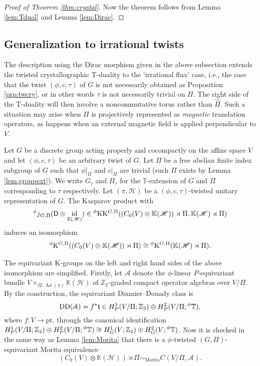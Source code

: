 \documentclass[11pt]{amsart}
\theoremstyle{definition}
\theoremstyle{plain}
\theoremstyle{remark}
\DeclareMathOperator{\id}{id}
\newcommand{\bK}{\mathbb{K}}
\newcommand{\bT}{\mathbb{T}}
\newcommand{\bZ}{\mathbb{Z}}
\newcommand{\cA}{\mathcal{A}}
\newcommand{\ft}{\mathfrak{t}}
\newcommand{\sfD}{\mathsf{D}}
\newcommand{\sH}{\mathscr{H}}
\newcommand{\K}{\mathrm{K}}%
\newcommand{\KK}{\mathrm{KK}}%
\DeclareMathOperator{\Ad}{Ad}
\newcommand{\pt}{\mathrm{pt}}
\begin{document}
\begin{proof}[Proof of Theorem \ref{thm:crystal}]
Now the theorem follows from Lemma \ref{lem:Tdual} and Lemma \ref{lem:Dirac}.
\end{proof}

\subsection{Generalization to irrational twists}\label{section:5.4}
The description using the Dirac morphism given in the above subsection extends the twisted crystallographic T-duality to the `irrational flux' case, i.e., the case that the twist $(\phi,c,\tau)$ of $G$ is not necessarily obtained as Proposition \ref{prp:twcry}, or in other words $\tau$ is not necessarily trivial on $\Pi$. The right side of the T-duality will then involve a noncommutative torus rather than $\hat{\Pi}$.
Such a situation may arise when $\Pi$ is projectively represented as \emph{magnetic} translation operators, as happens when an external magnetic field is applied perpendicular to $V$. 

Let $G$ be a discrete group acting properly and cocompactly on the affine space $V$ and let $(\phi,c,\tau)$ be an arbitrary twist of $G$. Let $\Pi$ be a free abelian finite index subgroup of $G$ such that $\phi|_\Pi$ and $c|_\Pi$ are trivial (such $\Pi$ exists by Lemma \ref{lem:groupext}). We write $G_\tau$ and $\Pi_\tau$ for the $\bT$-extension of $G$ and $\Pi$ corresponding to $\tau$ respectively. Let $(\pi, \sH)$ be a $(\phi,c,\tau)$-twisted unitary representation of $G$.
The Kasparov product with 
\[ \prescript{\phi}{}j_{G,\Pi} (\sfD \otimes \id_{\bK(\sH)}) \in \prescript{\phi}{}{\KK}^{G,\Pi}( (C_0(V) \otimes \bK(\sH)) \rtimes \Pi , \bK(\sH) \rtimes \Pi )  \]
induces an isomorphism 
\begin{align}
    \prescript{\phi}{}{\K}^{G,\Pi}((C_0(V) \otimes \bK(\sH)) \rtimes \Pi) \cong \prescript{\phi}{}{\K}^{G,\Pi}(\bK(\sH) \rtimes \Pi). \label{eq:irrBC}
\end{align} 

The equivariant K-groups on the left and right hand sides of the above isomorphism are simplified.
Firstly, let $\cA$ denote the $\phi$-linear $P$-equivariant bundle $V \times _{\Pi , \Ad(\pi)} \bK(\sH)$ of $\bZ_2$-graded compact operator algebras over $V/\Pi$. By the construction, the equivariant Dixmier--Douady class is
\[ \mathrm{DD}(\cA) = f^*\ft \in H^1_P(V/\Pi; \bZ_2) \oplus H^2_P(V/\Pi; \prescript{\phi}{}{\bT}), \]
where $f \colon V \to \pt$, through the canonical identification $H^1_P(V/\Pi; \bZ_2) \oplus H^2_P(V/\Pi; \prescript{\phi}{}{\bT})  \cong H^1_G(V; \bZ_2) \oplus H^2_G(V; \prescript{\phi}{}{\bT})$.
Now it is checked in the same way as Lemma \ref{lem:Morita} that there is a $\phi$-twisted $(G,\Pi)$-equivariant Morita equivalence
\[ (C_0(V) \otimes \bK(\sH)) \rtimes \Pi  \sim _{\mathrm{Morita }} C(V/\Pi, \cA).  \]
\end{document}
